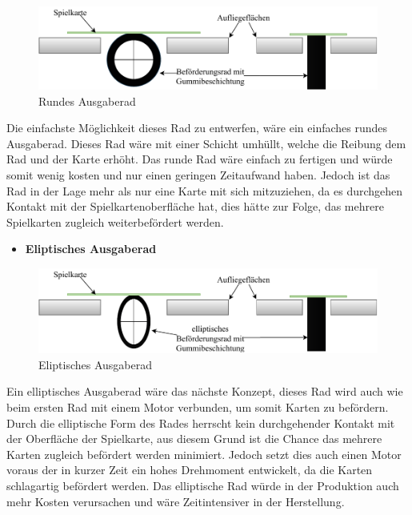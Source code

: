 \begin{figure}[H]
    \centering
    \includegraphics[scale=0.9,page=1]{fig/mech/RundesAusgaberad-Page-1}
    \caption{Rundes Ausgaberad}
\end{figure}

    Die einfachste Möglichkeit dieses Rad zu entwerfen, wäre ein einfaches rundes Ausgaberad. Dieses Rad wäre mit einer Schicht umhüllt, welche die Reibung
        dem Rad und der Karte erhöht. Das runde Rad wäre einfach zu fertigen und würde somit wenig kosten und nur einen geringen Zeitaufwand haben. Jedoch
        ist das Rad in der Lage mehr als nur eine Karte mit sich mitzuziehen, da es durchgehen Kontakt mit der Spielkartenoberfläche hat, dies hätte zur
        Folge, das mehrere Spielkarten zugleich weiterbefördert werden.
\begin{itemize}
    \item \textbf{Eliptisches Ausgaberad}
\end{itemize}

\begin{figure}[H]
    \centering
    \includegraphics[scale=0.9,page=1]{fig/mech/ElliptischesAusgaberad}
    \caption{Eliptisches Ausgaberad}
\end{figure}


Ein elliptisches Ausgaberad wäre das nächste Konzept, dieses Rad wird auch wie beim ersten Rad mit einem Motor verbunden, um somit Karten zu befördern.
Durch die elliptische Form des Rades herrscht kein durchgehender Kontakt mit der Oberfläche der Spielkarte, aus diesem Grund ist die Chance das mehrere
Karten zugleich befördert werden minimiert. Jedoch setzt dies auch einen Motor voraus der in kurzer Zeit ein hohes Drehmoment entwickelt, da die
Karten schlagartig befördert werden. Das elliptische Rad würde in der Produktion auch mehr Kosten verursachen und wäre Zeitintensiver in der Herstellung. \\

